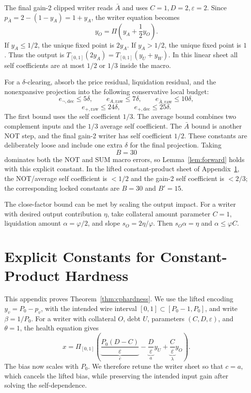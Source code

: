 \documentclass{llncs}
\newcommand{\clip}{\Pi}
\newcommand{\eps}{\varepsilon}
\newcommand{\T}{T_{[0,1]}}
\newcommand{\cf}{\varphi}
\begin{document}
The final gain-2 clipped writer reads \(\bar A\) and uses \(C=1,D=2,\eps=2\). Since \(p_{\bar A}=2-(1-y_A)=1+y_A\), the writer equation becomes
\[
 y_O=\clip\left(y_A+\frac{1}{2}y_O\right).
\]
If \(y_A\le 1/2\), the unique fixed point is \(2y_A\). If \(y_A>1/2\), the unique fixed point is \(1\). Thus the output is \(\T(2y_A)=\T(y_U+y_W)\). In this linear sheet all self coefficients are at most \(1/2\) or \(1/3\) inside the macro.

For a \(\delta\)-clearing, absorb the price residual, liquidation residual, and the nonexpansive projection into the following conservative local budget:
\[
        e_{\neg,\mathrm{dec}}\le 5\delta,\qquad
        e_{A,\mathrm{raw}}\le 7\delta,\qquad
        e_{\bar A,\mathrm{raw}}\le 10\delta,
\]
\[
        e_{+,\mathrm{raw}}\le 24\delta,\qquad
        e_{+,\mathrm{dec}}\le 25\delta .
\]
The first bound uses the self coefficient \(1/3\). The average bound combines two complement inputs and the \(1/3\) average self coefficient. The \(\bar A\) bound is another NOT step, and the final gain-2 writer has self coefficient \(1/2\). These constants are deliberately loose and include one extra \(\delta\) for the final projection. Taking
\[
        B=30
\]
dominates both the NOT and SUM macro errors, so Lemma~\ref{lem:forward} holds with this explicit constant. In the lifted constant-product sheet of Appendix~\ref{app:cpconstants}, the NOT/average self coefficient is \(<1/2\) and the gain-2 self coefficient is \(<2/3\); the corresponding locked constants are \(B=30\) and \(B'=15\).

The close-factor bound can be met by scaling the output impact. For a writer with desired output contribution \(\eta\), take collateral amount parameter \(C=1\), liquidation amount \(\alpha=\cf/2\), and slope \(s_O=2\eta/\cf\). Then \(s_O\alpha=\eta\) and \(\alpha\le \cf C\).

\section{Explicit Constants for Constant-Product Hardness}
\label{app:cpconstants}
This appendix proves Theorem~\ref{thm:cphardness}. We use the lifted encoding \(y_v=P_0-p_v\), with the intended wire interval \([0,1]\subset[P_0-1,P_0]\), and write \(\beta=1/P_0\). For a writer with collateral \(O\), debt \(U\), parameters \((C,D,\eps)\), and \(\theta=1\), the health equation gives
\[
 x=\clip_{[0,1]}\left(\underbrace{\frac{P_0(D-C)}{\eps}}_{c}
 -\underbrace{\frac{D}{\eps}}_{a}y_U+\underbrace{\frac{C}{\eps}}_{\lambda}y_O\right).
\]
The bias now scales with \(P_0\). We therefore retune the writer sheet so that \(c=a\), which cancels the lifted bias, while preserving the intended input gain after solving the self-dependence.
\end{document}
